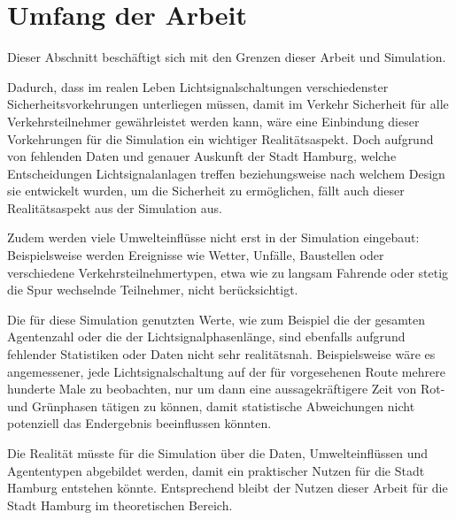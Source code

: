 %


\section{Umfang der Arbeit}\label{sec:delimitation}

Dieser Abschnitt beschäftigt sich mit den Grenzen dieser Arbeit und Simulation.

Dadurch, dass im realen Leben Lichtsignalschaltungen verschiedenster Sicherheitsvorkehrungen unterliegen müssen, damit im Verkehr Sicherheit für alle Verkehrsteilnehmer gewährleistet werden kann, wäre eine Einbindung dieser Vorkehrungen für die Simulation ein wichtiger Realitätsaspekt.
Doch aufgrund von fehlenden Daten und genauer Auskunft der Stadt Hamburg, welche Entscheidungen Lichtsignalanlagen treffen beziehungsweise nach welchem Design sie entwickelt wurden, um die Sicherheit zu ermöglichen, fällt auch dieser Realitätsaspekt aus der Simulation aus.

Zudem werden viele Umwelteinflüsse nicht erst in der Simulation eingebaut: Beispielsweise werden Ereignisse wie Wetter, Unfälle, Baustellen oder verschiedene Verkehrsteilnehmertypen, etwa wie zu langsam Fahrende oder stetig die Spur wechselnde Teilnehmer, nicht berücksichtigt.

Die für diese Simulation genutzten Werte, wie zum Beispiel die der gesamten Agentenzahl oder die der Lichtsignalphasenlänge, sind ebenfalls aufgrund fehlender Statistiken oder Daten nicht sehr realitätsnah.
Beispielsweise wäre es angemessener, jede Lichtsignalschaltung auf der für  vorgesehenen Route mehrere hunderte Male zu beobachten, nur um dann eine aussagekräftigere Zeit von Rot- und Grünphasen tätigen zu können, damit statistische Abweichungen nicht potenziell das Endergebnis beeinflussen könnten.

Die Realität müsste für die Simulation über die Daten, Umwelteinflüssen und Agententypen abgebildet werden, damit ein praktischer Nutzen für die Stadt Hamburg entstehen könnte.
Entsprechend bleibt der Nutzen dieser Arbeit für die Stadt Hamburg im theoretischen Bereich.
